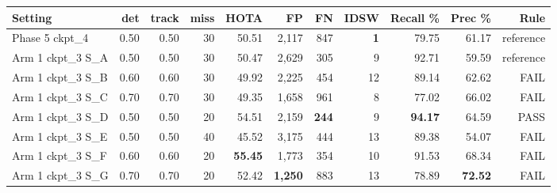 \begin{tabular}{lrrrrrrrrrr}
\toprule
Setting & det & track & miss & HOTA & FP & FN & IDSW & Recall \% & Prec \% & Rule \\
\midrule
Phase 5 ckpt\_4 & 0.50 & 0.50 & 30 & 50.51 & 2,117 & 847 & \textbf{1} & 79.75 & 61.17 & reference \\
Arm 1 ckpt\_3 S\_A & 0.50 & 0.50 & 30 & 50.47 & 2,629 & 305 & 9 & 92.71 & 59.59 & reference \\
Arm 1 ckpt\_3 S\_B & 0.60 & 0.60 & 30 & 49.92 & 2,225 & 454 & 12 & 89.14 & 62.62 & FAIL \\
Arm 1 ckpt\_3 S\_C & 0.70 & 0.70 & 30 & 49.35 & 1,658 & 961 & 8 & 77.02 & 66.02 & FAIL \\
Arm 1 ckpt\_3 S\_D & 0.50 & 0.50 & 20 & 54.51 & 2,159 & \textbf{244} & 9 & \textbf{94.17} & 64.59 & PASS \\
Arm 1 ckpt\_3 S\_E & 0.50 & 0.50 & 40 & 45.52 & 3,175 & 444 & 13 & 89.38 & 54.07 & FAIL \\
Arm 1 ckpt\_3 S\_F & 0.60 & 0.60 & 20 & \textbf{55.45} & 1,773 & 354 & 10 & 91.53 & 68.34 & FAIL \\
Arm 1 ckpt\_3 S\_G & 0.70 & 0.70 & 20 & 52.42 & \textbf{1,250} & 883 & 13 & 78.89 & \textbf{72.52} & FAIL \\
\bottomrule
\end{tabular}
